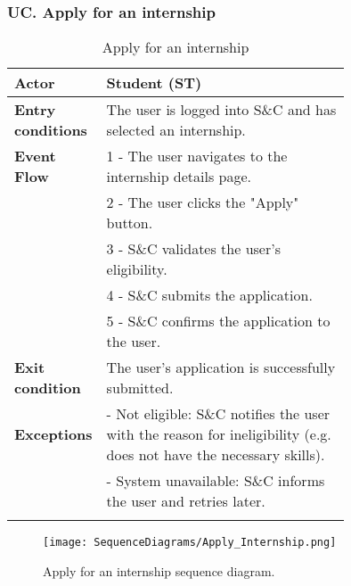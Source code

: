 \subsubsection*{UC\cuc . Apply for an internship}
\begin{center}
    \begin{longtable}{|l|p{0.75\linewidth}|}
        \hline
        \textbf{Actor}            & Student (ST) \\
        \hline
        \textbf{Entry conditions} & The user is logged into S\&C and has selected an internship. \\
        \hline
        \textbf{Event Flow}       & 1 - The user navigates to the internship details page. \\
        & 2 - The user clicks the "Apply" button. \\
        & 3 - S\&C validates the user's eligibility. \\
        & 4 - S\&C submits the application. \\
        & 5 - S\&C confirms the application to the user. \\
        \hline
        \textbf{Exit condition}   & The user's application is successfully submitted. \\       
        \hline
        \textbf{Exceptions}       & - Not eligible: S\&C notifies the user with the reason for ineligibility (e.g. does not have the necessary skills). \\
                                  & - System unavailable: S\&C informs the user and retries later. \\
        \hline
        \caption{Apply for an internship}
        \label{tab:apply_internship_usecase}
    \end{longtable}
\end{center}

\begin{figure}[H]
    \begin{center}
        \texttt{[image: SequenceDiagrams/Apply\_Internship.png]}
        \caption{Apply for an internship sequence diagram.}
        \label{fig:apply_internship_seqd}%
    \end{center}
\end{figure}

